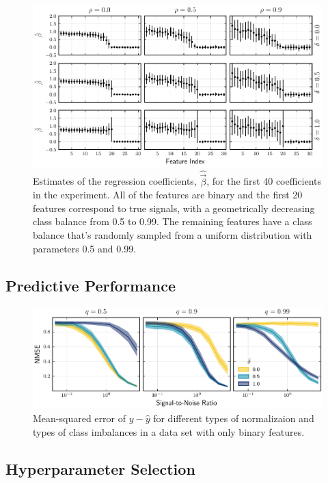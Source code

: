 \begin{figure}[htpb]
  \centering
  \includegraphics[]{plots/binary_decreasing.pdf}
  \caption{%
    Estimates of the regression coefficients, \(\hat{\vec{\beta}}\), for the first 40 coefficients in the experiment. All of the features are binary and the first 20 features correspond to true signals, with a geometrically decreasing class balance from 0.5 to 0.99. The remaining features have a class balance that's randomly sampled from a uniform distribution with parameters 0.5 and 0.99.}
  \label{fig:binary-decreasing}
\end{figure}






\subsection{Predictive Performance}

\begin{figure}[htpb]
  \centering
  \includegraphics[]{plots/binary_data_sim.pdf}
  \caption{%
    Mean-squared error of \(y - \hat y\) for different types of normalizaion and types of class imbalances in a data set with only binary features.
  }
  \label{fig:binary-sim}
\end{figure}

\subsection{Hyperparameter Selection}

